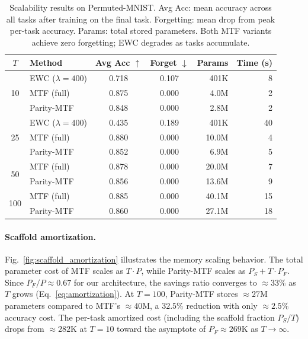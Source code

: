 \documentclass{article}
\begin{document}
\begin{table}[h]
\centering
\caption{Scalability results on Permuted-MNIST. Avg Acc: mean accuracy across all tasks after training on the final task. Forgetting: mean drop from peak per-task accuracy. Params: total stored parameters. Both MTF variants achieve zero forgetting; EWC degrades as tasks accumulate.}
\label{tab:scalability}
\vspace{0.1in}
\small
\begin{tabular}{clccrr}
\toprule
$T$ & Method & Avg Acc $\uparrow$ & Forget $\downarrow$ & Params & Time (s) \\
\midrule
\multirow{3}{*}{10}
& EWC ($\lambda\!=\!400$) & 0.718 & 0.107 & 401K & 8 \\
& MTF (full) & 0.875 & 0.000 & 4.0M & 2 \\
& Parity-MTF & 0.848 & 0.000 & 2.8M & 2 \\
\midrule
\multirow{3}{*}{25}
& EWC ($\lambda\!=\!400$) & 0.435 & 0.189 & 401K & 40 \\
& MTF (full) & 0.880 & 0.000 & 10.0M & 4 \\
& Parity-MTF & 0.852 & 0.000 & 6.9M & 5 \\
\midrule
\multirow{2}{*}{50}
& MTF (full) & 0.878 & 0.000 & 20.0M & 7 \\
& Parity-MTF & 0.856 & 0.000 & 13.6M & 9 \\
\midrule
\multirow{2}{*}{100}
& MTF (full) & 0.885 & 0.000 & 40.1M & 15 \\
& Parity-MTF & 0.860 & 0.000 & 27.1M & 18 \\
\bottomrule
\end{tabular}
\end{table}

\paragraph{Scaffold amortization.}
Fig.~\ref{fig:scaffold_amortization} illustrates the memory scaling behavior.
The total parameter cost of MTF scales as $T \cdot P$, while Parity-MTF scales as $P_S + T \cdot P_F$.
Since $P_F / P \approx 0.67$ for our architecture, the savings ratio converges to $\approx\!33\%$ as $T$ grows (Eq.~\ref{eq:amortization}).
At $T = 100$, Parity-MTF stores $\approx\!27$M parameters compared to MTF's $\approx\!40$M, a $32.5\%$ reduction with only $\approx\!2.5\%$ accuracy cost.
The per-task amortized cost (including the scaffold fraction $P_S / T$) drops from $\approx\!282$K at $T = 10$ toward the asymptote of $P_F \approx 269$K as $T \to \infty$.
\end{document}
